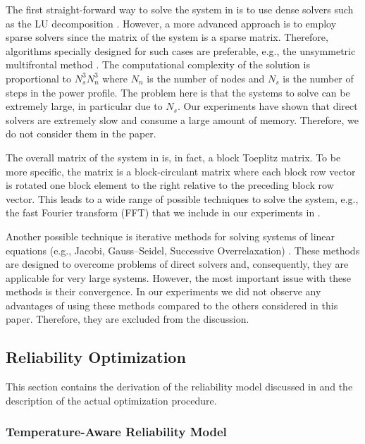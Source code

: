 The first straight-forward way to solve the system in  is to use
dense solvers such as the LU decomposition \cite{press2007}. However, a more
advanced approach is to employ sparse solvers since the matrix of the system is
a sparse matrix. Therefore, algorithms specially designed for such cases are
preferable, e.g., the unsymmetric multifrontal method \cite{davis2004}. The
computational complexity of the solution is proportional to $N_s^3 N_n^3$
\cite{press2007} where $N_n$ is the number of nodes and $N_s$ is the number of
steps in the power profile. The problem here is that the systems to solve can be
extremely large, in particular due to $N_s$. Our experiments have shown that
direct solvers are extremely slow and consume a large amount of memory.
Therefore, we do not consider them in the paper.

The overall matrix of the system in  is, in fact, a block Toeplitz
matrix. To be more specific, the matrix is a block-circulant matrix where each
block row vector is rotated one block element to the right relative to the
preceding block row vector. This leads to a wide range of possible techniques to
solve the system, e.g., the fast Fourier transform (FFT) \cite{mazancourt1983}
that we include in our experiments in .

Another possible technique is iterative methods for solving systems of linear
equations (e.g., Jacobi, Gauss--Seidel, Successive Overrelaxation)
\cite{press2007}. These methods are designed to overcome problems of direct
solvers and, consequently, they are applicable for very large systems. However,
the most important issue with these methods is their convergence. In our
experiments we did not observe any advantages of using these methods compared to
the others considered in this paper. Therefore, they are excluded from the
discussion.

\subsection{Reliability Optimization}

This section contains the derivation of the reliability model discussed in
 and the description of the actual optimization
procedure.

\subsubsection{Temperature-Aware Reliability Model}

